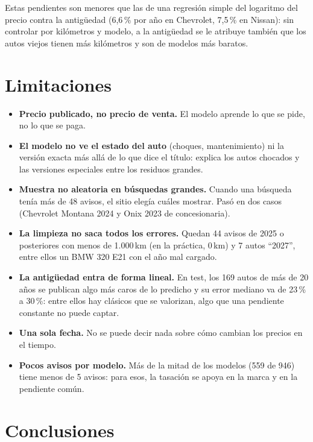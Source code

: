 \documentclass[11pt,a4paper]{article}
\begin{document}
Estas pendientes son menores que las de una regresión simple del logaritmo del precio contra la
antigüedad (6,6\,\% por año en Chevrolet, 7,5\,\% en Nissan): sin controlar por kilómetros y modelo, a la antigüedad se le atribuye
también que los autos viejos tienen más kilómetros y son de modelos más baratos.

\section{Limitaciones}

\begin{itemize}
\item \textbf{Precio publicado, no precio de venta.} El modelo aprende lo que se pide, no lo que se paga.
\item \textbf{El modelo no ve el estado del auto} (choques, mantenimiento) ni la versión exacta más allá
de lo que dice el título: explica los autos chocados y las versiones especiales entre los residuos grandes.
\item \textbf{Muestra no aleatoria en búsquedas grandes.} Cuando una búsqueda tenía más de 48 avisos, el
sitio elegía cuáles mostrar. Pasó en dos casos (Chevrolet Montana 2024 y Onix 2023 de concesionaria).
\item \textbf{La limpieza no saca todos los errores.} Quedan 44 avisos de 2025 o posteriores con menos de
1.000\,km (en la práctica, 0\,km) y 7 autos ``2027'', entre ellos un BMW 320 E21 con el año mal cargado.
\item \textbf{La antigüedad entra de forma lineal.} En test, los 169 autos de más de 20 años se publican
algo más caros de lo predicho y su error mediano va de 23\,\% a 30\,\%: entre ellos hay clásicos que se
valorizan, algo que una pendiente constante no puede captar.
\item \textbf{Una sola fecha.} No se puede decir nada sobre cómo cambian los precios en el tiempo.
\item \textbf{Pocos avisos por modelo.} Más de la mitad de los modelos (559 de 946) tiene menos de 5 avisos: para esos,
la tasación se apoya en la marca y en la pendiente común.
\end{itemize}

\section{Conclusiones}
\end{document}
